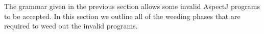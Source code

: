 The grammar given in the previous section allows some invalid AspectJ
programs to be accepted.   In this section we outline all of the weeding
phases that are required to weed out the invalid programs.
